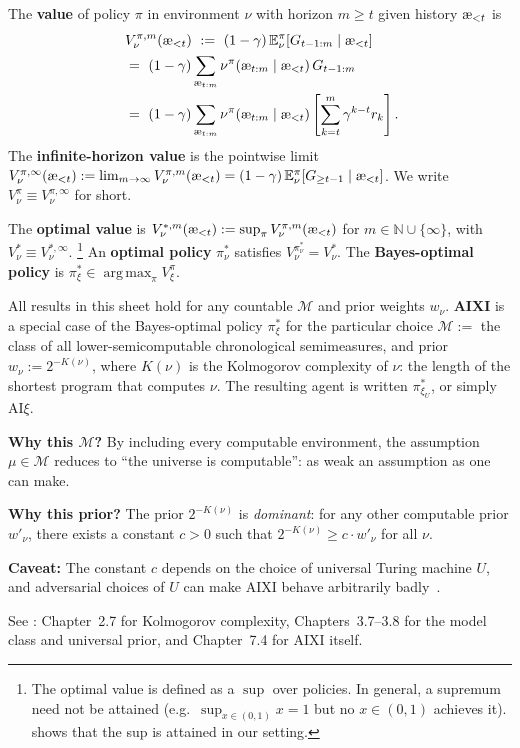 \documentclass[fontsize=11pt, parskip=half]{scrartcl}
\newcommand{\cM}{\mathcal{M}}
\newcommand{\Ex}{\mathbb{E}}
\DeclareMathOperator*{\argmax}{arg\,max}
\newcommand{\aes}{\textnormal{\ae}}
\begin{document}
\begin{definition}\label{def:value}
The \textbf{value} of policy $\pi$ in environment $\nu$ with horizon $m \geq t$ given history $\aes_{<t}$ is
\begin{align*}
    &V_\nu^{\pi,m}(\aes_{<t})
    ~:=~ (1-\gamma)\, \Ex_\nu^\pi\!\left[G_{t-1:m}  \mid \aes_{<t}\right] \\
    ~&=~ (1-\gamma) \sum_{\aes_{t:m}} \nu^\pi(\aes_{t:m} \mid \aes_{<t})\, G_{t-1:m} \\
    ~&=~ (1-\gamma) \sum_{\aes_{t:m}} \nu^\pi(\aes_{t:m} \mid \aes_{<t}) \left[ \sum_{k=t}^{m} \gamma^{k-t} r_k \right].
\end{align*}
The \textbf{infinite-horizon value} is the pointwise limit $V_\nu^{\pi,\infty}(\aes_{<t}) := \lim_{m \to \infty} V_\nu^{\pi,m}(\aes_{<t}) = (1-\gamma)\, \Ex_\nu^\pi[G_{\geq t-1} \mid \aes_{<t}]$.
We write $V_\nu^\pi \equiv V_\nu^{\pi,\infty}$ for short.

The \textbf{optimal value} is $V_\nu^{*,m}(\aes_{<t}) := \sup_\pi V_\nu^{\pi,m}(\aes_{<t})$ for $m \in \mathbb{N} \cup \{\infty\}$, with $V_\nu^* \equiv V_\nu^{*,\infty}$.%
\footnote{The optimal value is defined as a $\sup$ over policies.
In general, a supremum need not be attained (e.g.\ $\sup_{x \in (0,1)} x = 1$ but no $x \in (0,1)$ achieves it).
 shows that the sup is attained in our setting.}
An \textbf{optimal policy} $\pi_\nu^*$ satisfies $V_\nu^{\pi_\nu^*} = V_\nu^*$.
The \textbf{Bayes-optimal policy} is $\pi_\xi^* \in \argmax_\pi V_\xi^\pi$.
\end{definition}

\begin{remark}[AIXI]
All results in this sheet hold for any countable $\cM$ and prior weights $w_\nu$.
\textbf{AIXI} is a special case of the Bayes-optimal policy $\pi_\xi^*$ for the particular choice $\cM :=$ the class of all lower-semicomputable chronological semimeasures, and prior $w_\nu := 2^{-K(\nu)}$, where $K(\nu)$ is the Kolmogorov complexity of $\nu$: the length of the shortest program that computes $\nu$.
The resulting agent is written $\pi^*_{\xi_U}$, or simply AI$\xi$.

\textbf{Why this $\cM$?}
By including every computable environment, the assumption $\mu \in \cM$ reduces to ``the universe is computable'': as weak an assumption as one can make.

\textbf{Why this prior?}
The prior $2^{-K(\nu)}$ is \emph{dominant}: for any other computable prior $w'_\nu$, there exists a constant $c > 0$ such that $2^{-K(\nu)} \geq c \cdot w'_\nu$ for all $\nu$.

\textbf{Caveat:}
The constant $c$ depends on the choice of universal Turing machine $U$, and adversarial choices of $U$ can make AIXI behave arbitrarily badly~\cite{Leike:15badpriors}.

See \cite{Hutter:24uaibook2}: Chapter~2.7 for Kolmogorov complexity, Chapters~3.7--3.8 for the model class and universal prior, and Chapter~7.4 for AIXI itself.
\end{remark}
\end{document}
